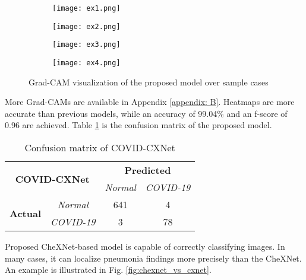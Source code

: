 \documentclass{article}
\begin{document}
\begin{figure}[H]
    \begin{subfigure}{0.5\linewidth}
        \centering
        \texttt{[image: ex1.png]}
        \label{fig:v1_ex1}
    \end{subfigure}
    \begin{subfigure}{0.5\linewidth}
        \centering
        \texttt{[image: ex2.png]}
        \label{fig:v1_ex2}
    \end{subfigure}
    \begin{subfigure}{0.5\linewidth}
        \centering
        \texttt{[image: ex3.png]}
        \label{fig:v1_ex3}
    \end{subfigure}
    \begin{subfigure}{0.5\linewidth}
        \centering
        \texttt{[image: ex4.png]}
        \label{fig:v1_ex4}
    \end{subfigure}
\caption{Grad-CAM visualization of the proposed model over sample cases}
\label{fig:cxnet_v1_heatmaps}
\end{figure}

\noindent More Grad-CAMs are available in Appendix \ref{appendix: B}. Heatmaps are more accurate than previous models, while an accuracy of 99.04\% and an f-score of 0.96 are achieved. Table \ref{cxnet_cm} is the confusion matrix of the proposed model.

\begin{table}[H]
\caption{Confusion matrix of COVID-CXNet}
\label{cxnet_cm}
\centering
\begin{tabular}{|c|c|c|c|}
\hline
\multicolumn{2}{|c|}{\multirow{2}{*}{\textbf{COVID-CXNet}}} & \multicolumn{2}{c|}{\textbf{Predicted}} \\ \cline{3-4} 
\multicolumn{2}{|c|}{}                                     & \textit{Normal}   & \textit{COVID-19}   \\ \hline
\multirow{2}{*}{\textbf{Actual}}    & \textit{Normal}      & 641                & 4                   \\ \cline{2-4} 
                                    & \textit{COVID-19}    & 3                 & 78                  \\ \hline
\end{tabular}
\end{table}

\noindent Proposed CheXNet-based model is capable of correctly classifying images. In many cases, it can localize pneumonia findings more precisely than the CheXNet. An example is illustrated in Fig. \ref{fig:chexnet_vs_cxnet}.
\end{document}
